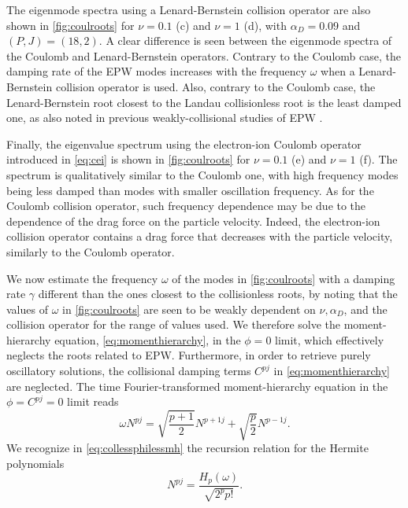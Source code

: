 The eigenmode spectra using a Lenard-Bernstein collision operator are also shown in \cref{fig:coulroots} for $\nu=0.1$ (c) and $\nu=1$ (d), with $\alpha_D=0.09$ and $(P,J)=(18,2)$.
%
A clear difference is seen between the eigenmode spectra of the Coulomb and Lenard-Bernstein operators.
%
Contrary to the Coulomb case, the damping rate of the EPW modes increases with the frequency {$\omega$} when a Lenard-Bernstein collision operator is used.
%
Also, contrary to the Coulomb case, the Lenard-Bernstein root closest to the Landau collisionless root is the least damped one, as also noted in previous weakly-collisional studies of EPW \citep{Bratanov2013}.

Finally, the eigenvalue spectrum using the electron-ion Coulomb operator introduced in \cref{eq:cei} is shown in \cref{fig:coulroots} for $\nu=0.1$ (e) and $\nu=1$ (f).
%
The spectrum is {qualitatively} similar to the Coulomb one, with high frequency modes being less damped than modes with smaller oscillation frequency.
%
As for the Coulomb collision operator, such {frequency} dependence may be due to the dependence of the drag force on the particle velocity.
%
{Indeed}, the electron-ion collision operator contains a drag force that decreases with the particle velocity, similarly to the Coulomb operator.

We now estimate the frequency $\omega$ of the modes in \cref{fig:coulroots} with a damping rate $\gamma$ different than the ones closest to the collisionless roots, by noting that {the values of} $\omega$ {in \cref{fig:coulroots} are} seen to be weakly dependent on $\nu, \alpha_D$, and the collision operator for the range of values used.
%
We therefore solve the moment-hierarchy equation, \cref{eq:momenthierarchy}, in the $\phi=0$ limit, which effectively neglects the roots related to EPW.
%
{Furthermore, in order to retrieve purely oscillatory solutions, the collisional damping terms $C^{pj}$ in \cref{eq:momenthierarchy} are neglected.}
%
The time Fourier-transformed moment-hierarchy equation in the $\phi=C^{pj}=0$ limit reads
%
\begin{equation}
    \omega N^{pj} = \sqrt{\frac{p+1}{2}}N^{p+1 j}+\sqrt{\frac{p}{2}}N^{p-1 j}.
\label{eq:collessphilessmh}
\end{equation}
%
We recognize in \cref{eq:collessphilessmh} the recursion relation for the Hermite polynomials 
%
\begin{equation}
    N^{pj}=\frac{H_p(\omega)}{\sqrt{2^p p!}}.
\label{eq:solcollessphilessmh}
\end{equation}
%

